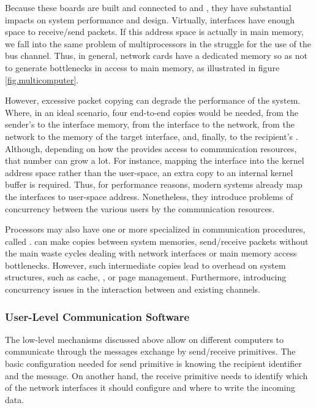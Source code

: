 				Because these boards are built and connected to \cpus and \ram,
				they have substantial impacts on system performance and \os design.
				Virtually, interfaces have enough \ram space to receive/send packets.
				If this address space is actually in main memory, we fall into the same
				problem of multiprocessors in the struggle for the use of the bus channel.
				Thus, in general, network cards have a dedicated memory so as not to
				generate bottlenecks in access to main memory, as illustrated in figure \ref{fig.multicomputer}.

				However, excessive packet copying can degrade the performance of the system.
				Where, in an ideal scenario, four end-to-end copies would be needed,
				\ie from the sender's \ram to the interface memory, from the interface
				to the network, from the network to the memory of the target interface, and,
				finally, to the recipient's \ram.
				Although, depending on how the \os provides access to communication
				resources, that number can grow a lot.
				For instance, mapping the interface into the kernel address space
				rather than the user-space, an extra copy to an internal kernel
				buffer is required.
				Thus, for performance reasons, modern systems already map the interfaces
				to user-space address.
				Nonetheless, they introduce problems of concurrency between the various
				users by the communication resources.

				Processors may also have one or more \cpus specialized in
				communication procedures, called \dma.
				\dmas can make copies between system memories, send/receive packets
				without the main \cpus waste cycles dealing with network interfaces
				or main memory access bottlenecks.
				However, such intermediate copies lead to overhead on system structures,
				such as cache, \tlb, or page management.
				Furthermore, introducing concurrency issues in the interaction between
				\cpus and existing \dma channels.

			\subsubsection{User-Level Communication Software}
			\label{sec.multicomputers-user-sw}

				The low-level mechanisms discussed above allow \cpus on different
				computers to communicate through the messages exchange by
				send/receive primitives.
				The basic configuration needed for send primitive is knowing the
				recipient identifier and the message.
				On another hand, the receive primitive needs to identify which of
				the network interfaces it should configure and where to write the
				incoming data.

